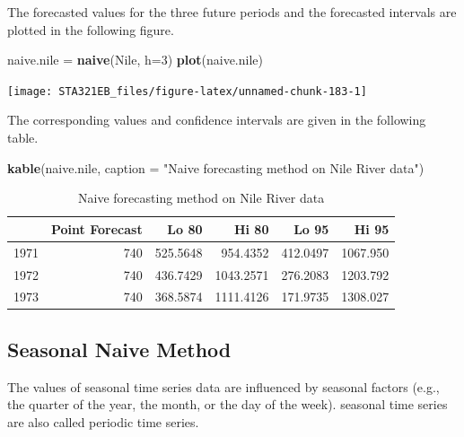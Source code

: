 \documentclass[
]{book}
\newenvironment{Shaded}{\begin{snugshade}}{\end{snugshade}}
\newcommand{\AttributeTok}[1]{\textcolor[rgb]{0.13,0.29,0.53}{#1}}
\newcommand{\DecValTok}[1]{\textcolor[rgb]{0.00,0.00,0.81}{#1}}
\newcommand{\FunctionTok}[1]{\textcolor[rgb]{0.13,0.29,0.53}{\textbf{#1}}}
\newcommand{\NormalTok}[1]{#1}
\newcommand{\OtherTok}[1]{\textcolor[rgb]{0.56,0.35,0.01}{#1}}
\newcommand{\StringTok}[1]{\textcolor[rgb]{0.31,0.60,0.02}{#1}}
\begin{document}
The forecasted values for the three future periods and the forecasted intervals are plotted in the following figure.

\begin{Shaded}
\begin{Highlighting}[]
\NormalTok{naive.nile }\OtherTok{=} \FunctionTok{naive}\NormalTok{(Nile, }\AttributeTok{h=}\DecValTok{3}\NormalTok{)}
\FunctionTok{plot}\NormalTok{(naive.nile)}
\end{Highlighting}
\end{Shaded}

\begin{center}\texttt{[image: STA321EB\_files/figure-latex/unnamed-chunk-183-1]} \end{center}

The corresponding values and confidence intervals are given in the following table.

\begin{Shaded}
\begin{Highlighting}[]
\FunctionTok{kable}\NormalTok{(naive.nile, }\AttributeTok{caption =} \StringTok{"Naive forecasting method on Nile River data"}\NormalTok{)}
\end{Highlighting}
\end{Shaded}

\begin{table}

\caption{\label{tab:unnamed-chunk-184}Naive forecasting method on Nile River data}
\centering
\begin{tabular}[t]{l|r|r|r|r|r}
\hline
  & Point Forecast & Lo 80 & Hi 80 & Lo 95 & Hi 95\\
\hline
1971 & 740 & 525.5648 & 954.4352 & 412.0497 & 1067.950\\
\hline
1972 & 740 & 436.7429 & 1043.2571 & 276.2083 & 1203.792\\
\hline
1973 & 740 & 368.5874 & 1111.4126 & 171.9735 & 1308.027\\
\hline
\end{tabular}
\end{table}

\hypertarget{seasonal-naive-method}{%
\subsection{Seasonal Naive Method}\label{seasonal-naive-method}}

The values of seasonal time series data are influenced by seasonal factors (e.g., the quarter of the year, the month, or the day of the week). seasonal time series are also called periodic time series.
\end{document}
